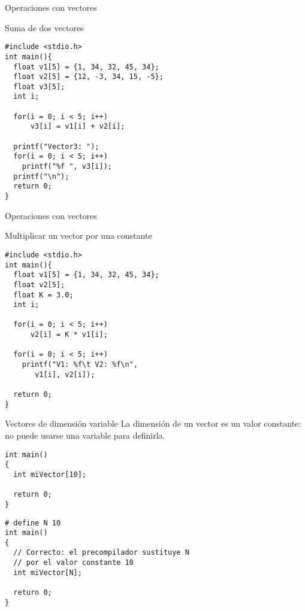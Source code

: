 \documentclass[xcolor={usenames,svgnames,dvipsnames}, aspectratio=169]{beamer}
\begin{document}
\begin{frame}[label={sec:orge1da0c1},fragile]{Operaciones con vectores}
 \begin{block}{Suma de dos vectores}
\lstset{language=C,label= ,caption= ,captionpos=b,numbers=none}
\begin{lstlisting}
#include <stdio.h>
int main(){
  float v1[5] = {1, 34, 32, 45, 34};
  float v2[5] = {12, -3, 34, 15, -5};
  float v3[5];
  int i;
  
  for(i = 0; i < 5; i++)
      v3[i] = v1[i] + v2[i];

  printf("Vector3: ");
  for(i = 0; i < 5; i++)
    printf("%f ", v3[i]);
  printf("\n");
  return 0;
}
\end{lstlisting}
\end{block}
\end{frame}

\begin{frame}[label={sec:org8d98d05},fragile]{Operaciones con vectores}
 \begin{block}{Multiplicar un vector por una constante}
\lstset{language=C,label= ,caption= ,captionpos=b,numbers=none}
\begin{lstlisting}
#include <stdio.h> 
int main(){
  float v1[5] = {1, 34, 32, 45, 34};
  float v2[5];
  float K = 3.0;
  int i;
  
  for(i = 0; i < 5; i++)
      v2[i] = K * v1[i];

  for(i = 0; i < 5; i++)
    printf("V1: %f\t V2: %f\n",
	   v1[i], v2[i]);

  return 0;
}
\end{lstlisting}
\end{block}
\end{frame}


\begin{frame}[label={sec:orgdf7fcf1},fragile]{Vectores de dimensión variable}
 La dimensión de un vector es un valor constante: \alert{no puede usarse una variable} para definirla.

\lstset{language=C,label= ,caption= ,captionpos=b,numbers=none}
\begin{lstlisting}
int main()
{
  int miVector[10];

  return 0;
}
\end{lstlisting}

\lstset{language=C,label= ,caption= ,captionpos=b,numbers=none}
\begin{lstlisting}
# define N 10
int main()
{
  // Correcto: el precompilador sustituye N
  // por el valor constante 10
  int miVector[N];

  return 0;
}
\end{lstlisting}
\end{frame}
\end{document}
